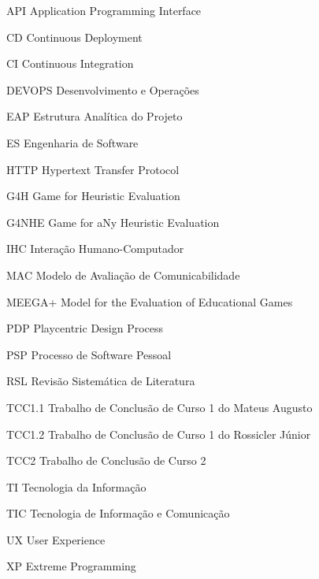 \begin{siglas}
  {\color{textadded} \item[API] Application Programming Interface}
  {\color{textadded} \item[CD] Continuous Deployment}
  {\color{textadded} \item[CI] Continuous Integration}
  {\color{textadded} \item[DEVOPS] Desenvolvimento e Operações}
  \item[EAP] Estrutura Analítica do Projeto
  \item[ES] Engenharia de Software
  {\color{textadded} \item[HTTP] Hypertext Transfer Protocol}
  \item[G4H] Game for Heuristic Evaluation 
  \item[G4NHE] Game for aNy Heuristic Evaluation
  \item[IHC] Interação Humano-Computador
  \item[MAC] Modelo de Avaliação de Comunicabilidade
  {\color{textadded} \item[MEEGA+] Model for the Evaluation of Educational Games}
  \item[PDP] Playcentric Design Process
  \item[PSP] Processo de Software Pessoal
  \item[RSL] Revisão Sistemática de Literatura
  \item[TCC1.1] Trabalho de Conclusão de Curso 1 do Mateus Augusto
  \item[TCC1.2] Trabalho de Conclusão de Curso 1 do Rossicler Júnior
  \item[TCC2] Trabalho de Conclusão de Curso 2
  \item[TI] Tecnologia da Informação
  \item[TIC] Tecnologia de Informação e Comunicação
  \item[UX] User Experience 
  {\color{textadded} \item[XP] Extreme Programming}

\end{siglas}
